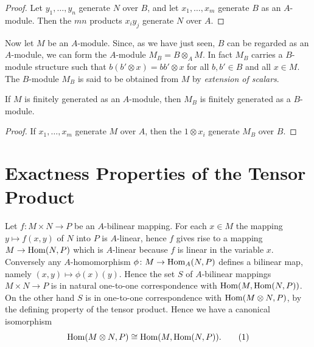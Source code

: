 \begin{proof}
Let $y_1, \ldots, y_n$ generate $N$ over $B$, and let $x_1, \ldots, x_m$ generate $B$ as an $A$-module. Then the $mn$ products $x_i y_j$ generate $N$ over $A$.
\end{proof}

Now let $M$ be an $A$-module. Since, as we have just seen, $B$ can be regarded as an $A$-module, we can form the $A$-module $M_B = B \otimes_A M$. In fact $M_B$ carries a $B$-module structure such that $b(b' \otimes x) = bb' \otimes x$ for all $b, b' \in B$ and all $x \in M$. The $B$-module $M_B$ is said to be obtained from $M$ by \emph{extension of scalars}.

\begin{proposition}\label{prop:finitely-generated-extension}
If $M$ is finitely generated as an $A$-module, then $M_B$ is finitely generated as a $B$-module.
\end{proposition}

\begin{proof}
If $x_1, \ldots, x_m$ generate $M$ over $A$, then the $1 \otimes x_i$ generate $M_B$ over $B$.
\end{proof}

\section*{Exactness Properties of the Tensor Product}

Let $f \colon M \times N \to P$ be an $A$-bilinear mapping. For each $x \in M$ the mapping $y \mapsto f(x, y)$ of $N$ into $P$ is $A$-linear, hence $f$ gives rise to a mapping $M \to \operatorname{Hom}(N, P)$ which is $A$-linear because $f$ is linear in the variable $x$. Conversely any $A$-homomorphism $\phi \colon M \to \operatorname{Hom}_A(N, P)$ defines a bilinear map, namely $(x, y) \mapsto \phi(x)(y)$. Hence the set $S$ of $A$-bilinear mappings $M \times N \to P$ is in natural one-to-one correspondence with $\operatorname{Hom}(M, \operatorname{Hom}(N, P))$. On the other hand $S$ is in one-to-one correspondence with $\operatorname{Hom}(M \otimes N, P)$, by the defining property of the tensor product. Hence we have a canonical isomorphism
\begin{equation}\label{eq:tensor-hom-adjunction}
    \operatorname{Hom}(M \otimes N, P) \cong \operatorname{Hom}(M, \operatorname{Hom}(N, P)). \tag{1}
\end{equation}

